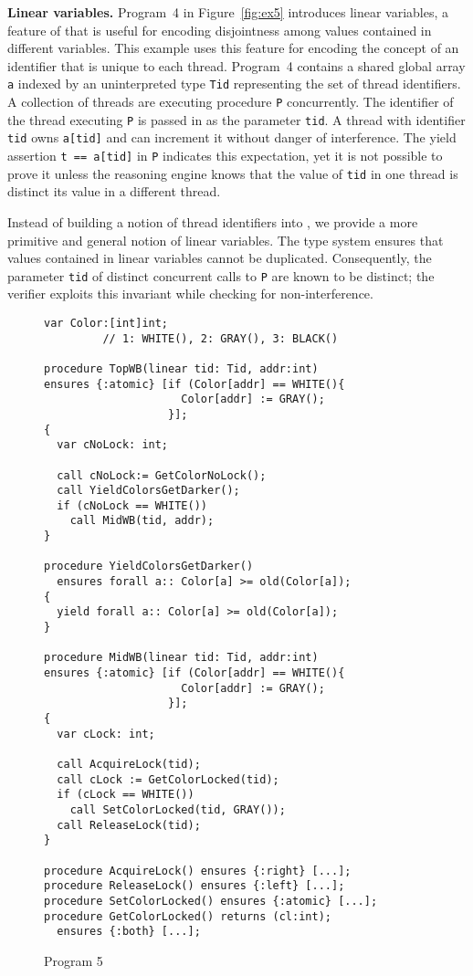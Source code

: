 {\bf Linear variables.}
Program~4 in Figure~\ref{fig:ex5} introduces linear variables, a feature of \civl 
that is useful for encoding disjointness among values contained in 
different variables.  
This example uses this feature for encoding the concept of an identifier 
that is unique to each thread.
Program~4 contains a shared global array {\tt a} indexed by an uninterpreted type {\tt Tid} 
representing the set of thread identifiers.
A collection of threads are executing procedure {\tt P} concurrently.
The identifier of the thread executing {\tt P} is passed in as the parameter {\tt tid}.
A thread with identifier {\tt tid} owns {\tt a[tid]} and can increment it without danger of interference.
The yield assertion {\tt t == a[tid]} in {\tt P} indicates this expectation, yet it is not possible to prove it 
unless the reasoning engine knows that the value of {\tt tid} in one thread is distinct 
its value in a different thread.

Instead of building a notion of thread identifiers into \civl, we provide a more 
primitive and general notion of linear variables.
The \civl type system ensures that values contained in linear variables cannot be duplicated.
Consequently, the parameter {\tt tid} of distinct concurrent calls to {\tt P} are known to be distinct;
the \civl verifier exploits this invariant while checking for non-interference.

\begin{figure}
\begin{verbatim}
var Color:[int]int; 
         // 1: WHITE(), 2: GRAY(), 3: BLACK()

procedure TopWB(linear tid: Tid, addr:int)
ensures {:atomic} [if (Color[addr] == WHITE(){
                     Color[addr] := GRAY();
                   }];
{
  var cNoLock: int;

  call cNoLock:= GetColorNoLock();
  call YieldColorsGetDarker(); 
  if (cNoLock == WHITE()) 
    call MidWB(tid, addr);
}

procedure YieldColorsGetDarker()
  ensures forall a:: Color[a] >= old(Color[a]);
{
  yield forall a:: Color[a] >= old(Color[a]);
}

procedure MidWB(linear tid: Tid, addr:int)
ensures {:atomic} [if (Color[addr] == WHITE(){
                     Color[addr] := GRAY();
                   }];
{
  var cLock: int;

  call AcquireLock(tid);
  call cLock := GetColorLocked(tid);
  if (cLock == WHITE()) 
    call SetColorLocked(tid, GRAY());
  call ReleaseLock(tid);
}

procedure AcquireLock() ensures {:right} [...];
procedure ReleaseLock() ensures {:left} [...];
procedure SetColorLocked() ensures {:atomic} [...];
procedure GetColorLocked() returns (cl:int);
  ensures {:both} [...];
\end{verbatim}
\caption{Program 5}
\label{fig:reft}
\end{figure}

